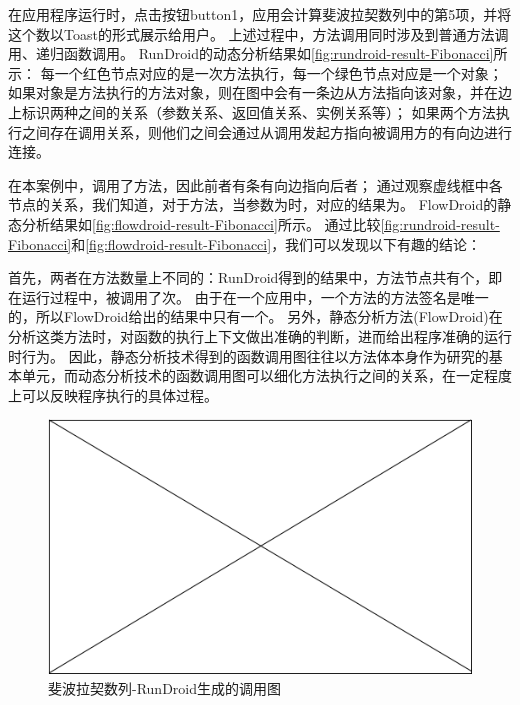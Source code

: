 在应用程序运行时，点击按钮button1，应用会计算斐波拉契数列中的第5项，并将这个数以Toast的形式展示给用户。
上述过程中，方法调用同时涉及到普通方法调用、递归函数调用。
RunDroid的动态分析结果如\autoref{fig:rundroid-result-Fibonacci}所示：
每一个红色节点对应的是一次方法执行，每一个绿色节点对应是一个对象；
如果对象是方法执行的方法对象，则在图中会有一条边从方法指向该对象，并在边上标识两种之间的关系（参数关系、返回值关系、实例关系等）；
如果两个方法执行之间存在调用关系，则他们之间会通过从调用发起方指向被调用方的有向边进行连接。

在本案例中，调用了方法，因此前者有条有向边指向后者；
通过观察虚线框中各节点的关系，我们知道，对于方法，当参数为时，对应的结果为。
FlowDroid的静态分析结果如\autoref{fig:flowdroid-result-Fibonacci}所示。
通过比较\autoref{fig:rundroid-result-Fibonacci}和\autoref{fig:flowdroid-result-Fibonacci}，我们可以发现以下有趣的结论：

首先，两者在方法数量上不同的：RunDroid得到的结果中，方法节点共有个，即在运行过程中，被调用了次。
由于在一个应用中，一个方法的方法签名是唯一的，所以FlowDroid给出的结果中只有一个。
另外，静态分析方法(FlowDroid)在分析这类方法时，对函数的执行上下文做出准确的判断，进而给出程序准确的运行时行为。
因此，静态分析技术得到的函数调用图往往以方法体本身作为研究的基本单元，而动态分析技术的函数调用图可以细化方法执行之间的关系，在一定程度上可以反映程序执行的具体过程。


\begin{figure}[!ht]
	\centering
	\includegraphics[width=\textwidth]{./Figures/empty.png}
	\caption{斐波拉契数列-RunDroid生成的调用图}
	\label{fig:rundroid-result-Fibonacci}
\end{figure}

